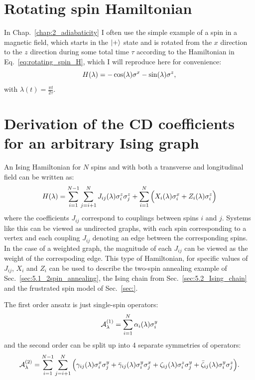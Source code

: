 \appendix

\chapter{Rotating spin Hamiltonian}\label{app:rotating_spin_hamiltonian}

In Chap.~\ref{chap:2_adiabaticity} I often use the simple example of a spin in a magnetic field, which starts in the $\ket{+}$ state and is rotated from the $x$ direction to the $z$ direction during some total time $\tau$ according to the Hamiltonian in Eq.~\eqref{eq:rotating_spin_H}, which I will reproduce here for convenience:
\begin{equation}\label{eq:rotating_spin_H_lambda}
    H(\lambda) = -\cos(\lambda)\sigma^x - \sin(\lambda)\sigma^z,
\end{equation}
with $\lambda(t) = \frac{\pi t}{2 \tau}$.


\chapter{Derivation of the CD coefficients for an arbitrary Ising graph}\label{app:arbitrary_ising_derivation}

An Ising Hamiltonian for $N$ spins and with both a transverse and longitudinal field can be written as:
\begin{equation}\label{eq:ising_hamiltonian}
    H(\lambda) = \sum_{i = 1}^{N-1}\sum_{j = i+1}^{N} J_{ij}(\lambda) \sigma^z_i \sigma^z_j + \sum_{i = 1}^{N} \Big( X_i(\lambda) \sigma^x_i + Z_i(\lambda) \sigma^z_i \Big)
\end{equation}
where the coefficients $J_{ij}$ correspond to couplings between spins $i$ and $j$. Systems like this can be viewed as undirected graphs, with each spin corresponding to a vertex and each coupling $J_{ij}$ denoting an edge between the corresponding spins. In the case of a weighted graph, the magnitude of each $J_{ij}$ can be viewed as the weight of the correspoding edge. This type of Hamiltonian, for specific values of $J_{ij}$, $X_i$ and $Z_i$ can be used to describe the two-spin annealing example of Sec.~\ref{sec:5.1_2spin_annealing}, the Ising chain from Sec.~\ref{sec:5.2_Ising_chain} and the frustrated spin model of Sec.~\ref{sec:}. 

The first order  ansatz is just single-spin operators:
\begin{equation}\label{eq:spin_agp_1storder}
    \mathcal{A}_{\lambda}^{(1)} = \sum_{i = 1}^N \alpha_i(\lambda) \sigma^y_i
\end{equation}
and the second order can be split up into 4 separate symmetries of operators:
\begin{equation}\label{eq:spin_agp_2ndorder}
        \mathcal{A}_{\lambda}^{(2)} = \sum_{i = 1}^{N-1}\sum_{j = i+1}^{N} \Big( \gamma_{ij}(\lambda) \sigma^x_i \sigma^y_j + \Bar{\gamma}_{ij}(\lambda) \sigma^y_i \sigma^x_j + \zeta_{ij}(\lambda) \sigma^z_i \sigma^y_j + \Bar{\zeta}_{ij}(\lambda) \sigma^y_i \sigma^z_j \Big).
\end{equation}

